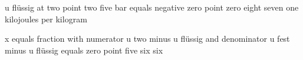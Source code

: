 u flüssig at two point two five bar equals negative zero point zero eight seven one kilojoules per kilogram

x equals fraction with numerator u two minus u flüssig and denominator u fest minus u flüssig equals zero point five six six